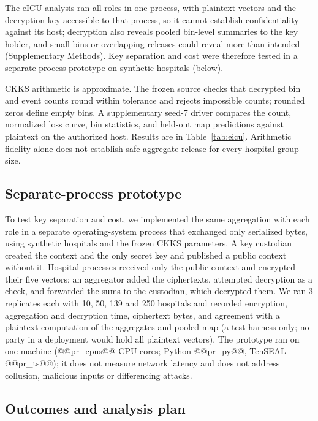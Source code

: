 \documentclass[11pt]{article}
\begin{document}
The eICU analysis ran all roles in one process, with plaintext vectors and the decryption key accessible to that process, so it cannot establish confidentiality against its host; decryption also reveals pooled bin-level summaries to the key holder, and small bins or overlapping releases could reveal more than intended (Supplementary Methods). Key separation and cost were therefore tested in a separate-process prototype on synthetic hospitals (below).

CKKS arithmetic is approximate. The frozen source checks that decrypted bin and event counts round within tolerance and rejects impossible counts; rounded zeros define empty bins. A supplementary seed-7 driver compares the count, normalized loss curve, bin statistics, and held-out map predictions against plaintext on the authorized host. Results are in Table~\ref{tab:eicu}. Arithmetic fidelity alone does not establish safe aggregate release for every hospital group size.

\subsection*{Separate-process prototype}\label{prototype-methods}

To test key separation and cost, we implemented the same aggregation with each role in a separate operating-system process that exchanged only serialized bytes, using synthetic hospitals and the frozen CKKS parameters. A key custodian created the context and the only secret key and published a public context without it. Hospital processes received only the public context and encrypted their five vectors; an aggregator added the ciphertexts, attempted decryption as a check, and forwarded the sums to the custodian, which decrypted them. We ran 3 replicates each with 10, 50, 139 and 250 hospitals and recorded encryption, aggregation and decryption time, ciphertext bytes, and agreement with a plaintext computation of the aggregates and pooled map (a test harness only; no party in a deployment would hold all plaintext vectors). The prototype ran on one machine (@@pr_cpus@@ CPU cores; Python @@pr_py@@, TenSEAL @@pr_ts@@); it does not measure network latency and does not address collusion, malicious inputs or differencing attacks.

\subsection*{Outcomes and analysis plan}\label{outcomes-and-analysis-plan}
\end{document}
